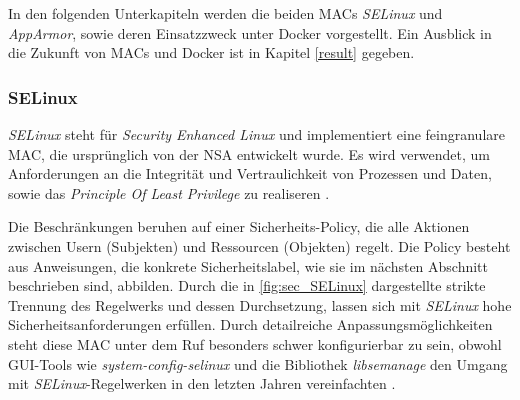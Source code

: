 \documentclass[../main.tex]{subfiles}
\begin{document}




			In den folgenden Unterkapiteln werden die beiden MACs \emph{SELinux} und \emph{AppArmor}, sowie deren Einsatzzweck unter Docker vorgestellt. Ein Ausblick in die Zukunft von MACs und Docker ist in Kapitel \ref{result} gegeben.

  		\subsubsection{\acrshort{SELinux}}
				\emph{SELinux} steht für \emph{Security Enhanced Linux} und implementiert eine feingranulare MAC, die ursprünglich von der NSA entwickelt wurde. Es wird verwendet, um Anforderungen an die Integrität und Vertraulichkeit von Prozessen und Daten, sowie das \emph{Principle Of Least Privilege} zu realiseren \cite{redhatSec}. %


				Die Beschränkungen beruhen auf einer Sicherheits-Policy, die alle Aktionen zwischen Usern (Subjekten) und Ressourcen (Objekten) regelt. Die Policy besteht aus Anweisungen, die konkrete Sicherheitslabel, wie sie im nächsten Abschnitt beschrieben sind, abbilden. Durch die in \fig \ref{fig:sec_SELinux} dargestellte strikte Trennung des Regelwerks und dessen Durchsetzung, lassen sich mit \emph{SELinux} hohe Sicherheitsanforderungen erfüllen. Durch detailreiche Anpassungsmöglichkeiten steht diese MAC unter dem Ruf besonders schwer konfigurierbar zu sein, obwohl GUI-Tools wie \emph{system-config-selinux} und die Bibliothek \emph{libsemanage} den Umgang mit \emph{SELinux}-Regelwerken in den letzten Jahren vereinfachten \cite[S.62,S.67]{linuxMagazineSec}.
\end{document}
